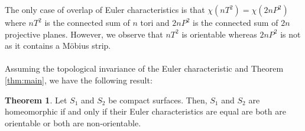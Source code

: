 \documentclass{article}
\theoremstyle{definition}
\newtheorem{theorem}{Theorem}[section]
\begin{document}
The only case of overlap of Euler characteristics is that $\chi(nT^2) = \chi(2nP^2)$ where $nT^2$ is the connected sum of $n$ tori and $2nP^2$ is the connected sum of $2n$ projective planes. However, we observe that $nT^2$ is orientable whereas $2nP^2$ is not as it contains a M\"{o}bius strip.  \\\\
Assuming the topological invariance of the Euler characteristic and Theorem \ref{thm:main}, we have the following result:
\begin{theorem}
  Let $S_1$ and $S_2$ be compact surfaces. Then, $S_1$ and $S_2$ are homeomorphic if and only if their Euler characteristics are equal are both are orientable or both are non-orientable.
\end{theorem}

%


\end{document}
